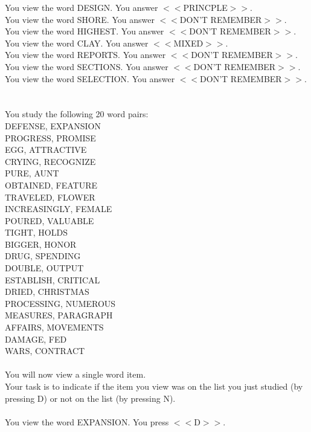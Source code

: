 \documentclass[pdflatex,sn-nature]{sn-jnl}%
\theoremstyle{thmstyleone}%
\theoremstyle{thmstyletwo}%
\theoremstyle{thmstylethree}%
\begin{document}
You view the word DESIGN. You answer $<<$PRINCPLE$>>$. $~$\\ 
You view the word SHORE. You answer $<<$DON'T REMEMBER$>>$. $~$\\ 
You view the word HIGHEST. You answer $<<$DON'T REMEMBER$>>$. $~$\\ 
You view the word CLAY. You answer $<<$MIXED$>>$. $~$\\ 
You view the word REPORTS. You answer $<<$DON'T REMEMBER$>>$. $~$\\ 
You view the word SECTIONS. You answer $<<$DON'T REMEMBER$>>$. $~$\\ 
You view the word SELECTION. You answer $<<$DON'T REMEMBER$>>$. $~$\\ 
 $~$\\ 
You study the following 20 word pairs: $~$\\ 
DEFENSE, EXPANSION $~$\\ 
PROGRESS, PROMISE $~$\\ 
EGG, ATTRACTIVE $~$\\ 
CRYING, RECOGNIZE $~$\\ 
PURE, AUNT $~$\\ 
OBTAINED, FEATURE $~$\\ 
TRAVELED, FLOWER $~$\\ 
INCREASINGLY, FEMALE $~$\\ 
POURED, VALUABLE $~$\\ 
TIGHT, HOLDS $~$\\ 
BIGGER, HONOR $~$\\ 
DRUG, SPENDING $~$\\ 
DOUBLE, OUTPUT $~$\\ 
ESTABLISH, CRITICAL $~$\\ 
DRIED, CHRISTMAS $~$\\ 
PROCESSING, NUMEROUS $~$\\ 
MEASURES, PARAGRAPH $~$\\ 
AFFAIRS, MOVEMENTS $~$\\ 
DAMAGE, FED $~$\\ 
WARS, CONTRACT $~$\\ 
 $~$\\ 
You will now view a single word item. $~$\\ 
Your task is to indicate if the item you view was on the list you just studied (by pressing D) or not on the list (by pressing N). $~$\\ 
 $~$\\ 
You view the word EXPANSION. You press $<<$D$>>$. 
\end{document}
